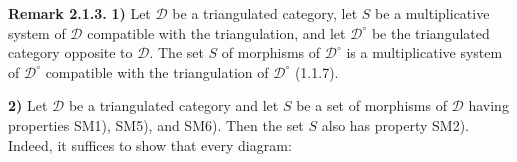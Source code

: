 \medskip
\noindent\textbf{Remark 2.1.3.}\quad
{}
\textbf{1)} Let $\mathcal D$ be a triangulated category, let $S$ be a
multiplicative system of $\mathcal D$ compatible with the triangulation, and
let $\mathcal D^\circ$ be the triangulated category opposite to $\mathcal D$.
The set $S$ of morphisms of $\mathcal D^\circ$ is a multiplicative system of
$\mathcal D^\circ$ compatible with the triangulation of $\mathcal D^\circ$
(1.1.7).

\smallskip
\noindent\textbf{2)} Let $\mathcal D$ be a triangulated category and let $S$
be a set of morphisms of $\mathcal D$ having properties SM1), SM5), and SM6).
Then the set $S$ also has property SM2).
Indeed, it suffices to show that every diagram:

\begin{center}
\end{center}
\endgroup
